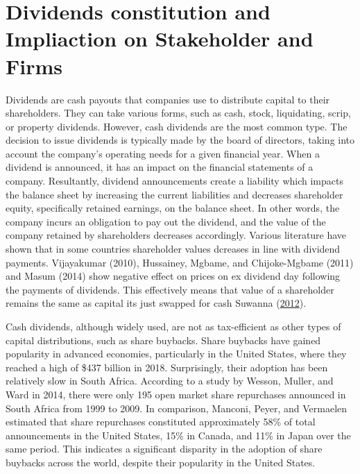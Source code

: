 \documentclass[11pt,preprint, authoryear]{elsarticle}
\numberwithin{equation}{section}
\numberwithin{figure}{section}
\numberwithin{table}{section}
\begin{document}
\hypertarget{dividends-constitution-and-impliaction-on-stakeholder-and-firms}{%
\section{Dividends constitution and Impliaction on Stakeholder and
Firms}\label{dividends-constitution-and-impliaction-on-stakeholder-and-firms}}

Dividends are cash payouts that companies use to distribute capital to
their shareholders. They can take various forms, such as cash, stock,
liquidating, scrip, or property dividends. However, cash dividends are
the most common type. The decision to issue dividends is typically made
by the board of directors, taking into account the company's operating
needs for a given financial year. When a dividend is announced, it has
an impact on the financial statements of a company. Resultantly,
dividend announcements create a liability which impacts the balance
sheet by increasing the current liabilities and decreases shareholder
equity, specifically retained earnings, on the balance sheet. In other
words, the company incurs an obligation to pay out the dividend, and the
value of the company retained by shareholders decreases accordingly.
Various literature have shown that in some countries shareholder values
dcreases in line with dividend payments. Vijayakumar (2010), Hussainey,
Mgbame, and Chijoke-Mgbame (2011) and Masum (2014) show negative effect
on prices on ex dividend day following the payments of dividends. This
effectively means that value of a shareholder remains the same as
capital its just swapped for cash Suwanna
(\protect\hyperlink{ref-suwanna2012impacts}{2012}).

Cash dividends, although widely used, are not as tax-efficient as other
types of capital distributions, such as share buybacks. Share buybacks
have gained popularity in advanced economies, particularly in the United
States, where they reached a high of \$437 billion in 2018.
Surprisingly, their adoption has been relatively slow in South Africa.
According to a study by Wesson, Muller, and Ward in 2014, there were
only 195 open market share repurchases announced in South Africa from
1999 to 2009. In comparison, Manconi, Peyer, and Vermaelen estimated
that share repurchases constituted approximately 58\% of total
announcements in the United States, 15\% in Canada, and 11\% in Japan
over the same period. This indicates a significant disparity in the
adoption of share buybacks across the world, despite their popularity in
the United States.
\end{document}
